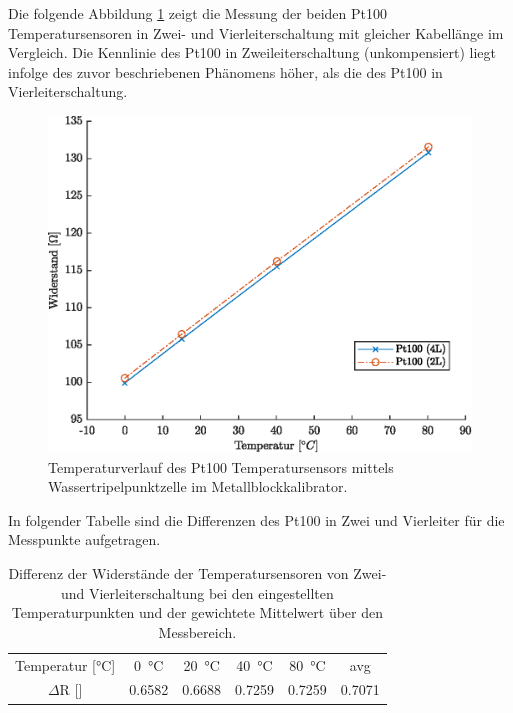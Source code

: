 Die folgende Abbildung \ref{fig:2L4L} zeigt die Messung der beiden Pt100 Temperatursensoren in Zwei- und Vierleiterschaltung mit gleicher Kabellänge im Vergleich. Die Kennlinie des Pt100 in Zweileiterschaltung (unkompensiert) liegt infolge des zuvor beschriebenen Phänomens höher, als die des Pt100 in Vierleiterschaltung. 

\begin{figure}[H]
	\centering
	\includegraphics[height=0.3\textheight]{../MLAB/Vergleich2L4L.eps}
	\caption[Temperaturverlauf des Pt100 Temperatursensors mittels Wassertripelpunktzelle]{ Temperaturverlauf des Pt100 Temperatursensors mittels Wassertripelpunktzelle im Metallblockkalibrator.}
	\label{fig:2L4L}
\end{figure}

In folgender Tabelle sind die Differenzen des Pt100 in Zwei und Vierleiter für die Messpunkte aufgetragen.

\begin{table}[H]
	\centering
	\caption{Differenz der Widerstände der Temperatursensoren von Zwei- und Vierleiterschaltung bei den eingestellten Temperaturpunkten und der gewichtete Mittelwert über den Messbereich.}
	\label{tab:VergleichTPZ}
	\begin{tabular}{cccccc}
		Temperatur [\si{\celsius}] & \SI{0}{\celsius} & \SI{20}{\celsius} & \SI{40}{\celsius}&\SI{80}{\celsius} & avg\\ 
		$\Delta$R [\ohm] & \num{0,6582} & \num{0.6688} &  \num{0,7259}& \num{0,7259}& \num{0.7071} \\
	\end{tabular} 
\end{table}

